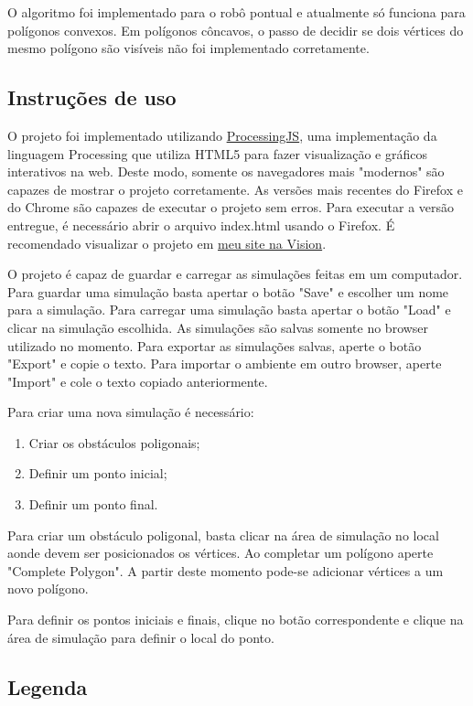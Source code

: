 \documentclass[11pt]{article} %
\begin{document}
O algoritmo foi implementado para o robô pontual e atualmente só funciona para polígonos convexos. Em polígonos côncavos, o passo de decidir se dois vértices do mesmo polígono são visíveis não foi implementado corretamente.

\subsection{Instruções de uso}

O projeto foi implementado utilizando  \href{http://processingjs.org/}{ProcessingJS}, uma implementação da linguagem Processing que utiliza HTML5 para fazer visualização e gráficos interativos na web. Deste modo, somente os navegadores mais "modernos" são capazes de mostrar o projeto corretamente. As versões mais recentes do Firefox e do Chrome são capazes de executar o projeto sem erros. Para executar a versão entregue, é necessário abrir o arquivo index.html usando o Firefox. É recomendado visualizar o projeto em \href{http://vision.ime.usp.br/~igor/geocomp}{meu site na Vision}.

O projeto é capaz de guardar e carregar as simulações feitas em um computador. Para guardar uma simulação basta apertar o botão "Save" e escolher um nome para a simulação. Para carregar uma simulação basta apertar o botão "Load" e clicar na simulação escolhida. As simulações são salvas somente no browser utilizado no momento. Para exportar as simulações salvas, aperte o botão "Export" e copie o texto. Para importar o ambiente em outro browser, aperte "Import" e cole o texto copiado anteriormente.

Para criar uma nova simulação é necessário:
\begin{enumerate}
	\item Criar os obstáculos poligonais;
	\item Definir um ponto inicial;
	\item Definir um ponto final.
\end{enumerate}

Para criar um obstáculo poligonal, basta clicar na área de simulação no local aonde devem ser posicionados os vértices. Ao completar um polígono aperte "Complete Polygon". A partir deste momento pode-se adicionar vértices a um novo polígono.

Para definir os pontos iniciais e finais, clique no botão correspondente e clique na área de simulação para definir o local do ponto.

\subsection{Legenda}
\end{document}
